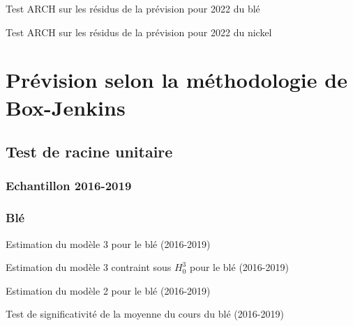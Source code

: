 \documentclass[12pt,a4paper]{article}
\begin{document}
\begin{table}[H]
    \centering
    \caption{Test ARCH sur les résidus de la prévision pour 2022 du blé}
    \sffamily
    \resizebox{0.8\textwidth}{!}{}
\end{table}

\begin{table}[H]
    \centering
    \caption{Test ARCH sur les résidus de la prévision pour 2022 du nickel}
    \sffamily
    \resizebox{0.8\textwidth}{!}{}
\end{table}
\clearpage
\section{Prévision selon la méthodologie de Box-Jenkins}
\setcounter{table}{0}
\setcounter{figure}{0}
\subsection{Test de racine unitaire}
\subsubsection{Echantillon 2016-2019}\label{appendix:ru_19}
\subsubsection*{Blé}
\begin{table}[H]
    \centering
    \caption{Estimation du modèle 3 pour le blé (2016-2019)}
    \label{tab:mod3_ble19}
    \sffamily
    \resizebox{0.8\textwidth}{!}{}
\end{table}

\begin{table}[H]
    \centering
    \caption{Estimation du modèle 3 contraint sous $H_{0}^{3}$ pour le blé (2016-2019)}
    \label{tab:mod3cont_ble19}
    \sffamily
    \resizebox{0.8\textwidth}{!}{}
\end{table}

\begin{table}[H]
    \centering
    \caption{Estimation du modèle 2 pour le blé (2016-2019)}
    \label{tab:mod2_ble19}
    \sffamily
    \resizebox{0.8\textwidth}{!}{}
\end{table}

\begin{table}[H]
    \centering
    \caption{Test de significativité de la moyenne du cours du blé (2016-2019)}
    \label{tab:testmoy_ble19}
    \sffamily
    \resizebox{0.6\textwidth}{!}{}
\end{table}
\end{document}

